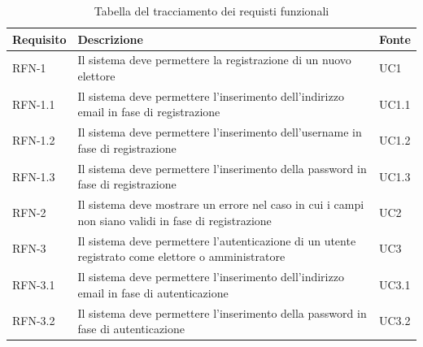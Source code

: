 \newpage

\begin{longtable}{| p{} | p{} | p{} |}
\caption{Tabella del tracciamento dei requisti funzionali}
\label{tab:requisiti-funzionali}
\hline

\textbf{Requisito} & \textbf{Descrizione} & \textbf{Fonte}\\

\hline

RFN-1     & Il sistema deve permettere la registrazione di un nuovo elettore & UC1 \\

\hline

RFN-1.1     & Il sistema deve permettere l'inserimento dell'indirizzo email in fase di registrazione & UC1.1 \\

\hline

RFN-1.2     & Il sistema deve permettere l'inserimento dell'username in fase di registrazione & UC1.2 \\

\hline

RFN-1.3     & Il sistema deve permettere l'inserimento della password in fase di registrazione & UC1.3 \\

\hline

RFN-2     & Il sistema deve mostrare un errore nel caso in cui i campi non siano validi in fase di registrazione & UC2 \\

\hline

RFN-3     & Il sistema deve permettere l'autenticazione di un utente registrato come elettore o amministratore & UC3 \\

\hline

RFN-3.1     & Il sistema deve permettere l'inserimento dell'indirizzo email in fase di autenticazione & UC3.1 \\

\hline

RFN-3.2     & Il sistema deve permettere l'inserimento della password in fase di autenticazione & UC3.2 \\

\hline


\end{longtable}
